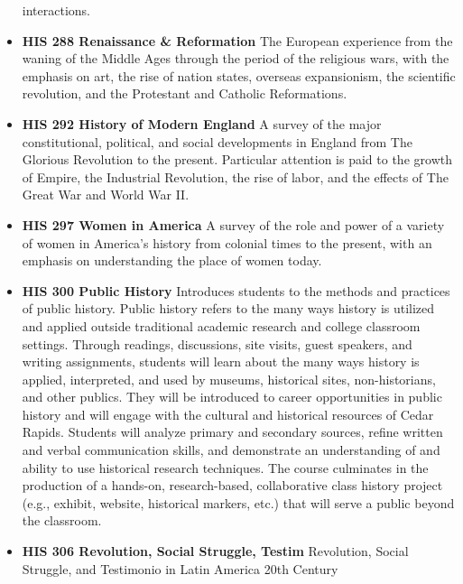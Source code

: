 \documentclass[
  letterpaper,
]{scrbook}
\begin{document}
\begin{itemize}
  interactions.
\item
  \textbf{HIS 288 Renaissance \& Reformation} The European experience
  from the waning of the Middle Ages through the period of the religious
  wars, with the emphasis on art, the rise of nation states, overseas
  expansionism, the scientific revolution, and the Protestant and
  Catholic Reformations.
\item
  \textbf{HIS 292 History of Modern England} A survey of the major
  constitutional, political, and social developments in England from The
  Glorious Revolution to the present. Particular attention is paid to
  the growth of Empire, the Industrial Revolution, the rise of labor,
  and the effects of The Great War and World War II.
\item
  \textbf{HIS 297 Women in America} A survey of the role and power of a
  variety of women in America's history from colonial times to the
  present, with an emphasis on understanding the place of women today.
\item
  \textbf{HIS 300 Public History} Introduces students to the methods and
  practices of public history. Public history refers to the many ways
  history is utilized and applied outside traditional academic research
  and college classroom settings. Through readings, discussions, site
  visits, guest speakers, and writing assignments, students will learn
  about the many ways history is applied, interpreted, and used by
  museums, historical sites, non-historians, and other publics. They
  will be introduced to career opportunities in public history and will
  engage with the cultural and historical resources of Cedar Rapids.
  Students will analyze primary and secondary sources, refine written
  and verbal communication skills, and demonstrate an understanding of
  and ability to use historical research techniques. The course
  culminates in the production of a hands-on, research-based,
  collaborative class history project (e.g., exhibit, website,
  historical markers, etc.) that will serve a public beyond the
  classroom.
\item
  \textbf{HIS 306 Revolution, Social Struggle, Testim} Revolution,
  Social Struggle, and Testimonio in Latin America 20th Century
\end{itemize}
\end{document}
